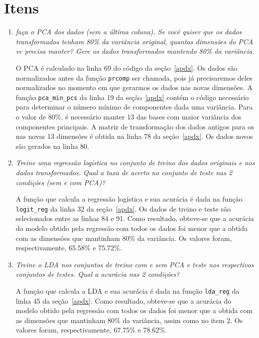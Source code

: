 \documentclass[10pt]{article}
\newcommand{\tit}[1]{\textit{#1}}
\newcommand{\ttt}[1]{\texttt{#1}}
\begin{document}
\section{Itens}
\begin{enumerate}
	\item \tit{faça o PCA dos dados (sem a última coluna). 
	Se você quiser que os dados transformados tenham 80\% da variância original, 
	quantas dimensões do PCA vc precisa manter?
	Gere os dados transformados mantendo 80\% da variância.}

	O PCA é calculado na linha 69 do código da seção~\ref{apdx}. 
	Os dados são normalizados antes da função \ttt{prcomp} ser chamada, pois
	já precisaremos deles normalizados no momento em que gerarmos os dados
	nas novas dimensões.
	A função \ttt{pca\_min\_pcs} da linha 19 da seção~\ref{apdx} contém o
	código necessário para determinar o número mínimo de componentes dada
	uma variância. Para o valor de 80\%, é necessário manter 13 das bases
	com maior variância dos componentes principais.
	A matriz de transformação dos dados antigos para os nas novas 13 dimensões
	é obtida na linha 78 da seção~\ref{apdx}. 	
	Os dados novos são gerados na linha 80.

	\item \tit{Treine uma regressão logística no conjunto de treino dos dados 
	originais e nos dados transformados. Qual a taxa de acerto no conjunto de 
	teste nas 2 condições (sem e com PCA)?}
	
	A função que calcula a regressão logística e sua acurácia é dada na 
	função \ttt{logit\_reg} da linha 32 da seção~\ref{apdx}. 
	Os dados de treino e teste são selecionados entre as linhas 84 e 91.
	Como resultado, obteve-se que a acurácia do modelo obtido pela regressão
	com todos os dados foi menor que a obtida com as dimensões que mantinham
	80\% da variância. Os valores foram, respectivamente, 65.58\% e 75.72\%.

	\item \tit{Treine o LDA nos conjuntos de treino com e sem PCA e teste nos 
	respectivos conjuntos de testes. Qual a acurácia nas 2 condições?}

	A função que calcula a LDA e sua acurácia é dada na 
	função \ttt{lda\_reg} da linha 45 da seção~\ref{apdx}. 
	Como resultado, obteve-se que a acurácia do modelo obtido pela regressão
	com todos os dados foi menor que a obtida com as dimensões que mantinham
	80\% da variância, assim como no item 2. 
	Os valores foram, respectivamente, 67.75\% e 78.62\%.


\end{enumerate}
\end{document}
